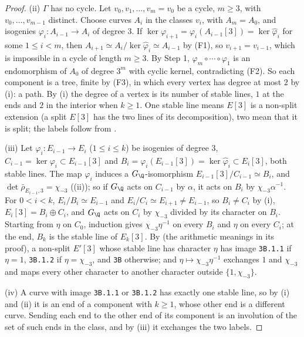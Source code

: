\begin{proof}
(ii) $\Gamma$ has no cycle. Let $v_0,v_1,\dots,v_m=v_0$ be a cycle, $m\ge3$, with $v_0,\dots,v_{m-1}$ distinct. Choose curves $A_i$ in the classes $v_i$, with
$A_m=A_0$, and isogenies $\varphi_i\colon A_{i-1}\to A_i$ of degree $3$. If $\ker\varphi_{i+1}=\varphi_i(A_{i-1}[3])=\ker\hat\varphi_i$ for some $1\le i<m$, then
$A_{i+1}\simeq A_i/\ker\hat\varphi_i\simeq A_{i-1}$ by (F1), so $v_{i+1}=v_{i-1}$, which is impossible in a cycle of length $m\ge3$. By Step 1,
$\varphi_m\circ\cdots\circ\varphi_1$ is an endomorphism of $A_0$ of degree $3^m$ with cyclic kernel, contradicting (F2). So each component is a tree,
finite by (F3), in which every vertex has degree at most $2$ by (i): a path. By (i) the degree of a vertex is its number of stable lines, $1$ at the
ends and $2$ in the interior when $k\ge1$. One stable line means $E[3]$ is a non-split extension (a split $E[3]$ has the two lines of its
decomposition), two mean that it is split; the labels follow from .

(iii) Let $\varphi_i\colon E_{i-1}\to E_i$ ($1\le i\le k$) be isogenies of degree $3$, $C_{i-1}=\ker\varphi_i\subset E_{i-1}[3]$ and $B_i=\varphi_i(E_{i-1}[3])=\ker\hat\varphi_i
\subset E_i[3]$, both stable lines. The map $\varphi_i$ induces a $G_\Q$-isomorphism $E_{i-1}[3]/C_{i-1}\simeq B_i$, and $\det\bar\rho_{E_{i-1},3}=\chi_{-3}$
((ii)); so if $G_\Q$ acts on $C_{i-1}$ by $\alpha$, it acts on $B_i$ by $\chi_{-3}\alpha^{-1}$. For $0<i<k$, $E_i/B_i\simeq E_{i-1}$ and
$E_i/C_i\simeq E_{i+1}\ne E_{i-1}$, so $B_i\ne C_i$ by (i), $E_i[3]=B_i\oplus C_i$, and $G_\Q$ acts on $C_i$ by $\chi_{-3}$ divided by its character on
$B_i$. Starting from $\eta$ on $C_0$, induction gives $\chi_{-3}\eta^{-1}$ on every $B_i$ and $\eta$ on every $C_i$; at the end, $B_k$ is the stable line of
$E_k[3]$. By  (the arithmetic meanings in its proof), a non-split $E'[3]$ whose stable line has character $\eta$ has image
\texttt{3B.1.1} if $\eta=1$, \texttt{3B.1.2} if $\eta=\chi_{-3}$, and \texttt{3B} otherwise; and $\eta\mapsto\chi_{-3}\eta^{-1}$ exchanges $1$ and $\chi_{-3}$ and maps
every other character to another character outside $\{1,\chi_{-3}\}$.

(iv) A curve with image \texttt{3B.1.1} or \texttt{3B.1.2} has exactly one stable line, so by (i) and (ii) it is an end of a component with $k\ge1$, whose
other end is a different curve. Sending each end to the other end of its component is an involution of the set of such ends in the class, and by
(iii) it exchanges the two labels.
\end{proof}

